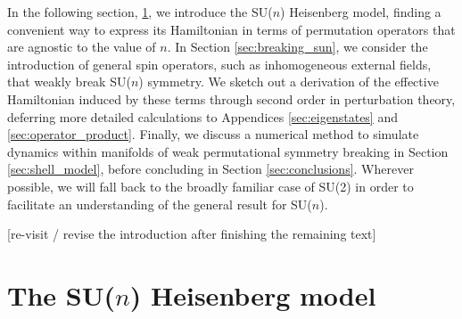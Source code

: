 \documentclass[nofootinbib,notitlepage,11pt]{revtex4-2}
\newcommand{\1}{\mathds{1}}
\newcommand{\red}[1]{{\color{red} #1}}
\begin{document}
In the following section, \ref{sec:bare_sun}, we introduce the SU($n$)
Heisenberg model, finding a convenient way to express its Hamiltonian
in terms of permutation operators that are agnostic to the value of
$n$.  In Section \ref{sec:breaking_sun}, we consider the introduction
of general spin operators, such as inhomogeneous external fields, that
weakly break SU($n$) symmetry.  We sketch out a derivation of the
effective Hamiltonian induced by these terms through second order in
perturbation theory, deferring more detailed calculations to
Appendices \ref{sec:eigenstates} and \ref{sec:operator_product}.
Finally, we discuss a numerical method to simulate dynamics within
manifolds of weak permutational symmetry breaking in Section
\ref{sec:shell_model}, before concluding in Section
\ref{sec:conclusions}.  Wherever possible, we will fall back to the
broadly familiar case of SU(2) in order to facilitate an understanding
of the general result for SU($n$).

\red{[re-visit / revise the introduction after finishing the remaining
  text]}

\section{The SU($n$) Heisenberg model}
\label{sec:bare_sun}
\end{document}
